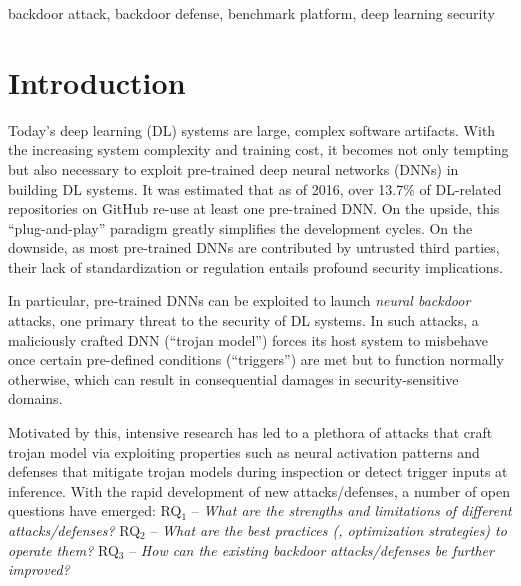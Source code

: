 \documentclass[compsoc,conference,a4paper,10pt,times]{IEEEtran}
\begin{document}
\begin{IEEEkeywords}
backdoor attack, backdoor defense, benchmark platform, deep learning security
\end{IEEEkeywords}

\section{Introduction}

Today's deep learning (DL) systems are large, complex software artifacts. With the increasing system complexity and training cost, it becomes not only tempting but also necessary to exploit pre-trained deep neural networks (DNNs) in building DL systems. It was estimated that as of 2016, over 13.7\% of DL-related repositories on GitHub re-use at least one pre-trained DNN. On the upside, this ``plug-and-play'' paradigm greatly simplifies the development cycles. On the downside, as most pre-trained DNNs are contributed by untrusted third parties, their lack of standardization or regulation entails profound security implications.

In particular, pre-trained DNNs can be exploited to launch {\em neural backdoor} attacks, one primary threat to the security of DL systems. In such attacks, a maliciously crafted DNN (``trojan model'') forces its host system to misbehave once certain pre-defined conditions (``triggers'') are met but to function normally otherwise, which can result in consequential damages in security-sensitive domains.


Motivated by this, intensive research has led to a plethora of attacks that craft trojan model via exploiting properties such as neural activation patterns and defenses that mitigate trojan models during  inspection or detect trigger inputs at inference. With the rapid development of new attacks/defenses, a number of open questions have emerged:  RQ$_1$ -- {\em What are the strengths and limitations of different attacks/defenses?} RQ$_2$ -- {\em What are the best practices (\meg, optimization strategies) to operate them?} RQ$_3$ -- {\em How can the existing backdoor attacks/defenses be further improved?}
\end{document}
